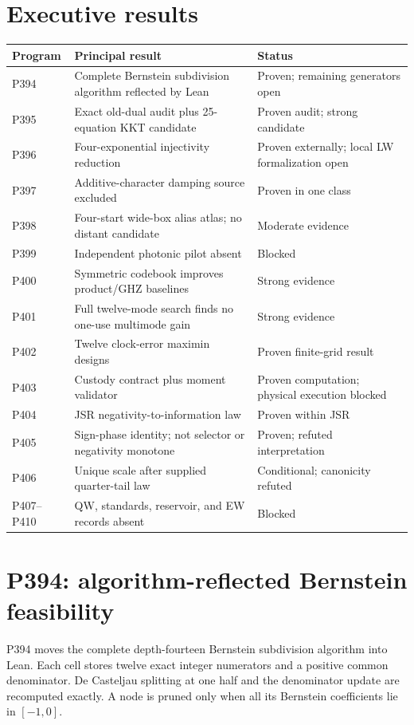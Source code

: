 \documentclass[11pt,a4paper,openany]{report}
\begin{document}
\chapter{Executive results}

\small
\begin{longtable}{@{}p{}p{}p{}@{}}
\toprule
\textbf{Program} & \textbf{Principal result} & \textbf{Status}\\
\midrule
\endhead
P394 & Complete Bernstein subdivision algorithm reflected by Lean & Proven; remaining generators open\\
P395 & Exact old-dual audit plus 25-equation KKT candidate & Proven audit; strong candidate\\
P396 & Four-exponential injectivity reduction & Proven externally; local LW formalization open\\
P397 & Additive-character damping source excluded & Proven in one class\\
P398 & Four-start wide-box alias atlas; no distant candidate & Moderate evidence\\
P399 & Independent photonic pilot absent & Blocked\\
P400 & Symmetric codebook improves product/GHZ baselines & Strong evidence\\
P401 & Full twelve-mode search finds no one-use multimode gain & Strong evidence\\
P402 & Twelve clock-error maximin designs & Proven finite-grid result\\
P403 & Custody contract plus moment validator & Proven computation; physical execution blocked\\
P404 & JSR negativity-to-information law & Proven within JSR\\
P405 & Sign-phase identity; not selector or negativity monotone & Proven; refuted interpretation\\
P406 & Unique scale after supplied quarter-tail law & Conditional; canonicity refuted\\
P407--P410 & QW, standards, reservoir, and EW records absent & Blocked\\
\bottomrule
\end{longtable}
\normalsize

\chapter{P394: algorithm-reflected Bernstein feasibility}

P394 moves the complete depth-fourteen Bernstein subdivision algorithm into
Lean. Each cell stores twelve exact integer numerators and a positive common
denominator. De Casteljau splitting at one half and the denominator update
are recomputed exactly. A node is pruned only when all its Bernstein
coefficients lie in $[-1,0]$.
\end{document}
